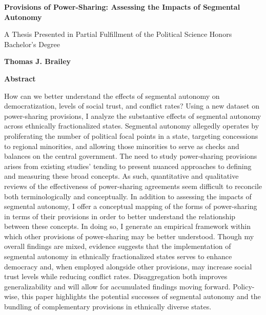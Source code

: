 \documentclass[12pt]{article}
\begin{document}
\begin{titlepage}

\begin{center}
\vspace{1cm}
\LARGE
\textbf{Provisions of Power-Sharing: Assessing the Impacts of Segmental Autonomy}

\large
\vspace{.5cm}

A Thesis Presented in Partial Fulfillment of the Political Science Honors Bachelor's Degree\\

\vspace{.5cm}

\textbf{Thomas J. Brailey}\\

\vspace{.5cm}
\Large
\vspace{.5cm}
\Large

\textbf{Abstract}
\end{center}

How can we better understand the effects of segmental autonomy on democratization, levels of social trust, and conflict rates? Using a new dataset on power-sharing provisions, I analyze the substantive effects of segmental autonomy across ethnically fractionalized states. Segmental autonomy allegedly operates by proliferating the number of political focal points in a state, targeting concessions to regional minorities, and allowing those minorities to serve as checks and balances on the central government. The need to study power-sharing provisions arises from existing studies' tending to present nuanced approaches to defining and measuring these broad concepts. As such, quantitative and qualitative reviews of the effectiveness of power-sharing agreements seem difficult to reconcile both terminologically and conceptually. In addition to assessing the impacts of segmental autonomy, I offer a conceptual mapping of the forms of power-sharing in terms of their provisions in order to better understand the relationship between these concepts. In doing so, I generate an empirical framework within which other provisions of power-sharing may be better understood. Though my overall findings are mixed, evidence suggests that the implementation of segmental autonomy in ethnically fractionalized states serves to enhance democracy and, when employed alongside other provisions, may increase social trust levels while reducing conflict rates. Disaggregation both improves generalizability and will allow for accumulated findings moving forward. Policy-wise, this paper highlights the potential successes of segmental autonomy and the bundling of complementary provisions in ethnically diverse states. 


\end{titlepage}
\end{document}
